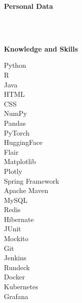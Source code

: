 \documentclass[10pt,a4paper,ragged2e,withhyper]{altacv}
\renewcommand{\cvsectionfont}{\Large\sffamily\bfseries}
\renewcommand{\cvsection}[2][]{%
  \nointerlineskip\bigskip%
  \ifstrequal{#1}{}{}{\marginpar{\vspace*{\dimexpr1pt-\baselineskip}\raggedright}}%
  {\color{heading}\cvsectionfont{#2}}\\[-1ex]%
  \makebox[0pt][l]{\color{headingrule}\rule{\dimexpr\linewidth+0.25cm}{1pt}}\par\medskip
}
\begin{document}



\begin{paracol}{2}

\cvsection{Personal Data}

\\[1em]
\\[1em]

\vspace{2em}

\cvsection{Knowledge and Skills}

Python\\[1em]
R\\[1em]
Java\\[1em]
HTML\\[1em]
CSS\\[1em]
NumPy\\[1em]
Pandas\\[1em]
PyTorch\\[1em]
HuggingFace\\[1em]
Flair\\[1em]
Matplotlib\\[1em]
Plotly\\[1em]
Spring Framework\\[1em]
Apache Maven\\[1em]
MySQL\\[1em]
Redis\\[1em]
Hibernate\\[1em]
JUnit\\[1em]
Mockito\\[1em]
Git\\[1em]
Jenkins\\[1em]
Rundeck\\[1em]
Docker\\[1em]
Kubernetes\\[1em]
Grafana\\[1em]


\end{paracol}
\end{document}
